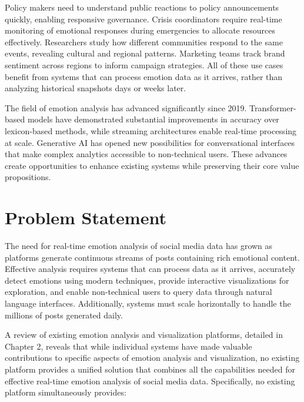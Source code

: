 Policy makers need to understand public reactions to policy announcements quickly, enabling responsive governance. Crisis coordinators require real-time monitoring of emotional responses during emergencies to allocate resources effectively. Researchers study how different communities respond to the same events, revealing cultural and regional patterns. Marketing teams track brand sentiment across regions to inform campaign strategies. All of these use cases benefit from systems that can process emotion data as it arrives, rather than analyzing historical snapshots days or weeks later.

The field of emotion analysis has advanced significantly since 2019. Transformer-based models have demonstrated substantial improvements in accuracy over lexicon-based methods, while streaming architectures enable real-time processing at scale. Generative AI has opened new possibilities for conversational interfaces that make complex analytics accessible to non-technical users. These advances create opportunities to enhance existing systems while preserving their core value propositions.


\section{Problem Statement}

The need for real-time emotion analysis of social media data has grown as platforms generate continuous streams of posts containing rich emotional content. Effective analysis requires systems that can process data as it arrives, accurately detect emotions using modern techniques, provide interactive visualizations for exploration, and enable non-technical users to query data through natural language interfaces. Additionally, systems must scale horizontally to handle the millions of posts generated daily.

A review of existing emotion analysis and visualization platforms, detailed in Chapter 2, reveals that while individual systems have made valuable contributions to specific aspects of emotion analysis and visualization, no existing platform provides a unified solution that combines all the capabilities needed for effective real-time emotion analysis of social media data. Specifically, no existing platform simultaneously provides:

